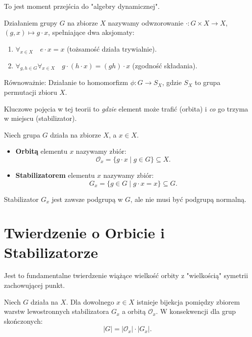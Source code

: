To jest moment przejścia do "algebry dynamicznej".

\begin{definition}
Działaniem grupy $G$ na zbiorze $X$ nazywamy odwzorowanie $\cdot : G \times X \to X$, $(g, x) \mapsto g \cdot x$, spełniające dwa aksjomaty:
\begin{enumerate}
    \item $\forall_{x \in X} \quad e \cdot x = x$ (tożsamość działa trywialnie).
    \item $\forall_{g,h \in G} \forall_{x \in X} \quad g \cdot (h \cdot x) = (gh) \cdot x$ (zgodność składania).
\end{enumerate}
Równoważnie: Działanie to homomorfizm $\phi: G \to S_X$, gdzie $S_X$ to grupa permutacji zbioru $X$.
\end{definition}

Kluczowe pojęcia w tej teorii to \textit{gdzie} element może trafić (orbita) i \textit{co} go trzyma w miejscu (stabilizator).

\begin{definition}
Niech grupa $G$ działa na zbiorze $X$, a $x \in X$.
\begin{itemize}
    \item \textbf{Orbitą} elementu $x$ nazywamy zbiór:
    \[ \mathcal{O}_x = \{ g \cdot x \mid g \in G \} \subseteq X. \]
    \item \textbf{Stabilizatorem} elementu $x$ nazywamy zbiór:
    \[ G_x = \{ g \in G \mid g \cdot x = x \} \subseteq G. \]
\end{itemize}
\end{definition}

\begin{fact}
Stabilizator $G_x$ jest zawsze podgrupą w $G$, ale nie musi być podgrupą normalną.
\end{fact}

\section{Twierdzenie o Orbicie i Stabilizatorze}

Jest to fundamentalne twierdzenie wiążące wielkość orbity z "wielkością" symetrii zachowującej punkt.

\begin{theorem}
Niech $G$ działa na $X$. Dla dowolnego $x \in X$ istnieje bijekcja pomiędzy zbiorem warstw lewostronnych stabilizatora $G_x$ a orbitą $\mathcal{O}_x$.
W konsekwencji dla grup skończonych:
\[ |G| = |\mathcal{O}_x| \cdot |G_x|. \]
\end{theorem}

